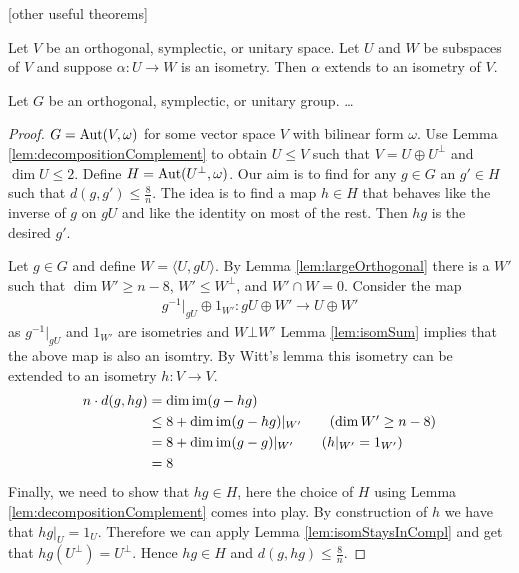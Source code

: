 [other useful theorems]


\begin{theorem}[Witt]
Let $V$ be an orthogonal, symplectic, or unitary space. Let $U$ and $W$ be subspaces of $V$ and suppose $\alpha\colon U\to W$ is an isometry. Then $\alpha$ extends to an isometry of $V$.
\end{theorem}

\begin{lemma}
Let $G$ be an orthogonal, symplectic, or unitary group. \dots
\end{lemma}
\begin{proof}
$G=\operatorname{Aut}(V,\omega)$ for some vector space $V$ with  bilinear form $\omega$. Use Lemma \ref{lem:decompositionComplement} to obtain $U\leq V$ such that $V=U\oplus U^\bot$ and $\dim U\leq2$. Define $H=\operatorname{Aut}(U^\bot,\omega)$. Our aim is to find for any $g\in G$ an $g'\in H$ such that $d(g,g')\leq\frac{8}{n}$.
The idea is to find a map $h\in H$ that behaves like the inverse of $g$ on $gU$ and like the identity on most of the rest. Then $hg$ is the desired $g'$.

Let $g\in G$ and define $W=\langle U,gU\rangle$. By Lemma \ref{lem:largeOrthogonal} there is a $W'$ such that $\dim W'\geq n-8$, $W'\leq W^\bot$, and $W'\cap W=0$. Consider the map
\begin{align*}
 g^{-1}|_{gU}\oplus 1_{W'}\colon gU\oplus W'\to U\oplus W'
\end{align*}
as $g^{-1}|_{gU}$ and $1_{W'}$ are isometries and $W\bot W'$ Lemma \ref{lem:isomSum} implies that the above map is also an isomtry. By Witt's lemma this isometry can be extended to an isometry $h\colon V\to V$. 
\begin{align*}
n\cdot d(g,hg)&=\dim\im (g-hg)\\
&\leq 8+\dim \im(g-hg)|_{W'}\tag{$\dim W'\geq n-8$}\\
&= 8+\dim \im(g-g)|_{W'}\tag{$h|_{W'}=1_{W'}$}\\
&=8
\end{align*}
Finally, we need to show that $hg\in H$, here the choice of $H$ using Lemma \ref{lem:decompositionComplement} comes into play. By construction of $h$ we have that $hg|_U=1_U$. Therefore we can apply Lemma \ref{lem:isomStaysInCompl} and get that $hg(U^\bot)= U^\bot$. Hence $hg\in H$ and $d(g,hg)\leq\frac{8}{n}$.

\end{proof}